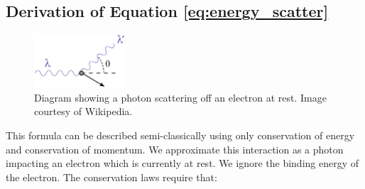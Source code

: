 \documentclass[%
 reprint,
 amsmath,amssymb,
 aps,
 pra,
]{revtex4-1}
\begin{document}
\begin{appendix}

\section{Derivation of Equation \ref{eq:energy_scatter}} \label{section:derivation}

\begin{figure}[H]
	\centering
	\includegraphics[width=0.3\textwidth]{../plots/ComptonDiagram.png}
	\caption{Diagram showing a photon scattering off an electron at rest. Image courtesy of Wikipedia.}
\end{figure}

This formula can be described semi-classically using only conservation of energy and conservation of momentum. We approximate this interaction as a photon impacting an electron which is currently at rest. We ignore the binding energy of the electron. The conservation laws require that:


\end{appendix}
\end{document}
